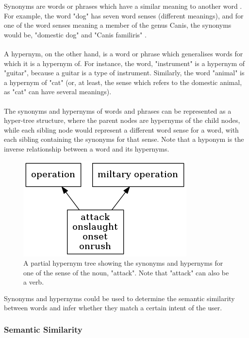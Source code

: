 \documentclass[12pt]{article}
\begin{document}
Synonyms are words or phrases which have a similar meaning to another word  \cite{RefWorks:44}. For example, the word "dog" has seven word senses (different meanings), and for one of the word senses meaning a member of the genus Canis, the synonyms would be, "domestic dog" and "Canis familiris" \cite{RefWorks:45}.
\\
\\
A hypernym, on the other hand, is a word or phrase which generalises words for which it is a hypernym of. For instance, the word, "instrument" is a hypernym of "guitar", because a guitar is a type of instrument. Similarly, the word "animal" is a hypernym of "cat" (or, at least, the sense which refers to the domestic animal, as "cat" can have several meanings).
\\
\\
The synonyms and hypernyms of words and phrases can be represented as a hyper-tree structure, where the parent nodes are hypernyms of the child nodes, while each sibling node would represent a different word sense for a word, with each sibling containing the synonyms for that sense. Note that a hyponym is the inverse relationship between a word and its hypernyms.

\begin{center}
\begin{figure}[H]
\begin{center}
  \includegraphics[scale=1]{hypernym-tree.png}
  \caption{A partial hypernym tree showing the synonyms and hypernyms for one of the sense of the noun, "attack". Note that "attack" can also be a verb.}
  \end{center}
\end{figure}
\end{center}

Synonyms and hypernyms could be used to determine the semantic similarity between words and infer whether they match a certain intent of the user.


\subsubsection{Semantic Similarity}
\end{document}
